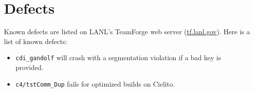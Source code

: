 \documentclass[note]{ResearchNote_pdf}
\begin{document}


\section{Defects}

Known defects are listed on LANL's TeamForge web server
(\url{tf.lanl.gov}).  Here is a list of known defects:
\begin{itemize}
\item \texttt{cdi\_gandolf} will crash with a segmentation violation
  if a bad key is provided.
\item \texttt{c4/tstComm\_Dup} fails for optimized builds on Cielito.
\end{itemize}
\end{document}
